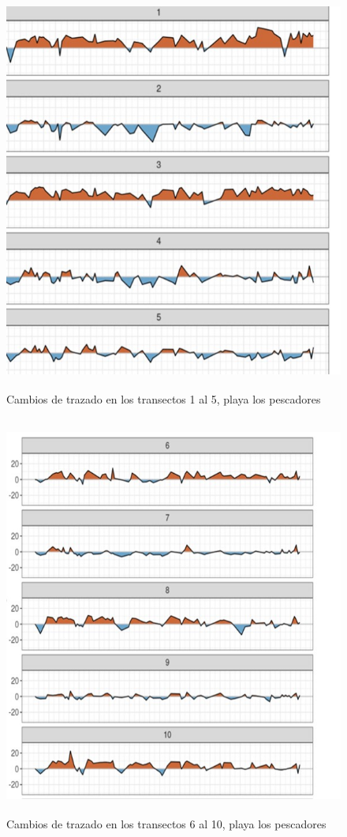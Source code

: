 \documentclass[11pt,]{article}
\begin{document}
\begin{figure}
\centering
\includegraphics[height=5.20833in]{Rcoast_transectos1.jpg}
\caption{Cambios de trazado en los transectos 1 al 5, playa los
pescadores\label{transectosdplaya1}}
\end{figure}

\begin{figure}
\centering
\includegraphics[height=5.20833in]{Rcoast_transectos2.jpg}
\caption{Cambios de trazado en los transectos 6 al 10, playa los
pescadores\label{transectosdplaya2}}
\end{figure}
\end{document}
